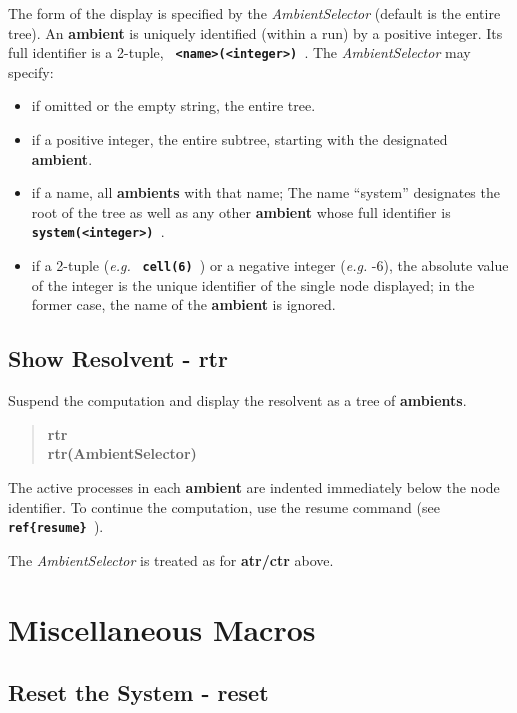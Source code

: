 \documentclass[twoside,10pt]{report}
\begin{document}
\noindent
The form of the display is specified
by the {\em AmbientSelector} (default is the entire tree).  An {\bf ambient} is
uniquely identified (within a run) by a positive integer.  Its
full identifier is a 2-tuple, {\bf \verb+ <name>(<integer>) +}.  The
{\em AmbientSelector} may specify:

\begin{itemize}
\item if omitted or the empty string, the entire tree.
\item if a positive integer, the entire subtree, starting with the
  designated {\bf ambient}.
\item if a name, all {\bf ambients} with that name;
  The name ``system'' designates the root of the tree as well as
  any other {\bf ambient} whose full identifier is {\bf \verb+ system(<integer>) +}.
\item if a 2-tuple ({\em e.g.} {\bf \verb+ cell(6) +}) or a negative integer 
  ({\em e.g.} -6), the absolute value of the integer is the unique
  identifier of the single node displayed; in the former case,
  the name of the {\bf ambient} is ignored.
\end{itemize}

\subsection{Show Resolvent - rtr}
\label{rtr}

Suspend the computation and display the resolvent as a tree of {\bf ambients}.

\begin{verse}
 {\bfseries
   rtr \\
   rtr(AmbientSelector)
 }
\end{verse}

\noindent
The active processes in each {\bf ambient} are indented immediately below 
the node identifier.
To continue the computation, use the resume command
(see {\bf \verb+ ref{resume} +}).

\noindent
The {\em AmbientSelector} is treated as for {\bf atr/ctr} above.

\section{Miscellaneous Macros}

\subsection{Reset the System - reset}
\label{reset}
\end{document}
